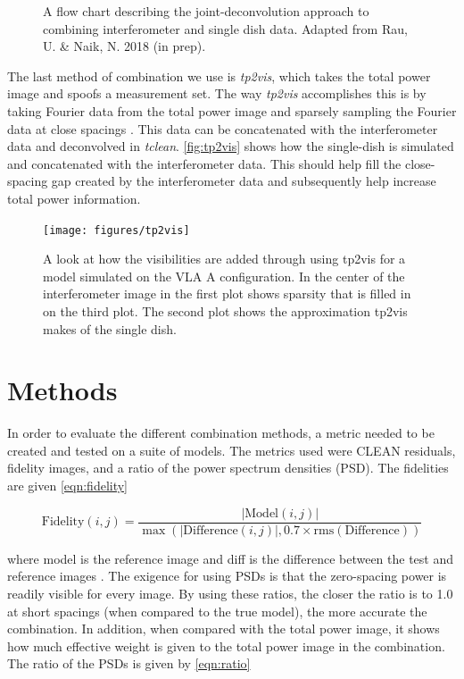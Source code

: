 \documentclass[preprint]{aastex63}
\begin{document}
\begin{figure}[t]
    \caption{A flow chart describing the joint-deconvolution approach to combining interferometer and single dish data. Adapted from Rau, U. \& Naik, N. 2018 (in prep).}
    \label{fig:jd-flow}
\end{figure}

The last method of combination we use is \textit{tp2vis}, which takes the total power image and spoofs a measurement set. The way \textit{tp2vis} accomplishes this is by taking Fourier data from the total power image and sparsely sampling the Fourier data at close spacings \citep[see][]{2011ApJS..193...19K}. This data can be concatenated with the interferometer data and deconvolved in \textit{tclean}. \autoref{fig:tp2vis} shows how the single-dish is simulated and concatenated with the interferometer data. This should help fill the close-spacing gap created by the interferometer data and subsequently help increase total power information.

\begin{figure}[t]
    \texttt{[image: figures/tp2vis]}
    \caption{A look at how the visibilities are added through using tp2vis for a model simulated on the VLA A configuration. In the center of the interferometer image in the first plot shows sparsity that is filled in on the third plot. The second plot shows the approximation tp2vis makes of the single dish.}
    \label{fig:tp2vis}
\end{figure}


\section{Methods}

In order to evaluate the different combination methods, a metric needed to be created and tested on a suite of models. The metrics used were CLEAN residuals, fidelity images, and a ratio of the power spectrum densities (PSD). The fidelities are given \autoref{eqn:fidelity} 
 
\begin{equation}
    \text{Fidelity}(i, j) = \frac{|\text{Model}(i, j)|}{\max{\left(|\text{Difference}(i, j)|, 0.7\times\text{rms}(\text{Difference})\right)}}
    \label{eqn:fidelity}
\end{equation} 

where model is the reference image and diff is the difference between the test and reference images \citep[p.19]{almamemo}. The exigence for using PSDs is that the zero-spacing power is readily visible for every image. By using these ratios, the closer the ratio is to 1.0 at short spacings (when compared to the true model), the more accurate the combination. In addition, when compared with the total power image, it shows how much effective weight is given to the total power image in the combination. The ratio of the PSDs is given by \autoref{eqn:ratio}
\end{document}
